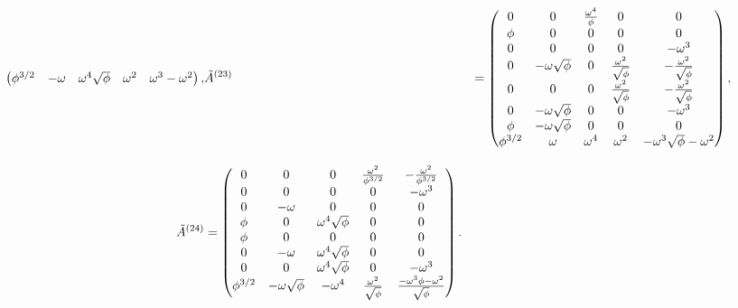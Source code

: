 \begin{align}
\begin{pmatrix}
    \phi^{3/2} & -\omega & \omega^4 \sqrt{\phi} & \omega^2 & \omega^3-\omega^2 \\
  \end{pmatrix}, &
  \tilde{A}^{(23)} &= \begin{pmatrix}
    0 & 0 & \frac{\omega^4}{\phi} & 0 & 0 \\
    \phi & 0 & 0 & 0 & 0 \\
    0 & 0 & 0 & 0 & -\omega^3 \\
    0 & -\omega\sqrt{\phi} & 0 & \frac{\omega^2}{\sqrt{\phi}} & -\frac{\omega^2}{\sqrt{\phi}} \\
    0 & 0 & 0 & \frac{\omega^2}{\sqrt{\phi}} & -\frac{\omega^2}{\sqrt{\phi}} \\
    0 & -\omega\sqrt{\phi} & 0 & 0 & -\omega^3 \\
    \phi & -\omega\sqrt{\phi} & 0 & 0 & 0 \\
    \phi^{3/2} & \omega & \omega^4 & \omega^2 & -\omega^3\sqrt{\phi} -\omega^2 \\
  \end{pmatrix}, \notag \\[2ex]
  \tilde{A}^{(24)} &= \begin{pmatrix}
    0 & 0 & 0 & \frac{\omega^2}{\phi^{3/2}} & -\frac{\omega^2}{\phi^{3/2}} \\
    0 & 0 & 0 & 0 & -\omega^3 \\
    0 & -\omega & 0 & 0 & 0 \\
    \phi & 0 & \omega^4 \sqrt{\phi} & 0 & 0 \\
    \phi & 0 & 0 & 0 & 0 \\
    0 & -\omega & \omega^4 \sqrt{\phi} & 0 & 0 \\
    0 & 0 & \omega^4 \sqrt{\phi} & 0 & -\omega^3 \\
    \phi^{3/2} & -\omega\sqrt{\phi} & -\omega^4 & \frac{\omega^2}{\sqrt{\phi}} & \frac{-\omega^3\phi-\omega^2}{\sqrt{\phi}} \\
  \end{pmatrix}.
  \label{eq:2+1d-fib-solution-2}
\end{align}
\endgroup
